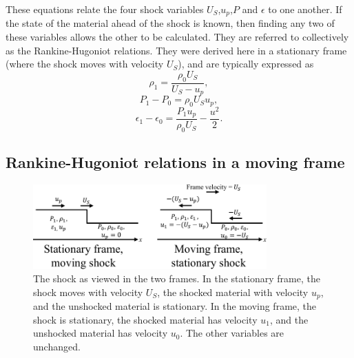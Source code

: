 These equations relate the four shock variables $U_S$,$u_p$,$P$ and $\epsilon$ to one another. If the state of the material ahead of the shock is known, then finding any two of these variables allows the other to be calculated. They are referred to collectively as the Rankine-Hugoniot relations. They were derived here in a stationary frame (where the shock moves with velocity $U_S$), and are typically expressed as
\begin{equation} \rho_1 = \frac{\rho_0 U_S}{U_S - u_p}, \label{eqn: RH1 stationary} \end{equation}
\begin{equation} P_1 - P_0 = \rho_0 U_S u_p, \label{eqn: RH2 stationary} \end{equation}
\begin{equation} \epsilon_1 - \epsilon_0 = \frac{P_1 u_p}{\rho_0 U_S} - \frac{u^2}{2}. \label{eqn: RH3 stationary} \end{equation}

\subsection{Rankine-Hugoniot relations in a moving frame}

\begin{figure}
\centering
\includegraphics[width=0.8\textwidth]{figures/Theory/ReferenceFrames.pdf}%
\caption{\label{fig:ReferenceFrames} The shock as viewed in the two frames. In the stationary frame, the shock moves with velocity $U_S$, the shocked material with velocity $u_p$, and the unshocked material is stationary. In the moving frame, the shock is stationary, the shocked material has velocity $u_1$, and the unshocked material has velocity $u_0$. The other variables are unchanged.}
\end{figure}


